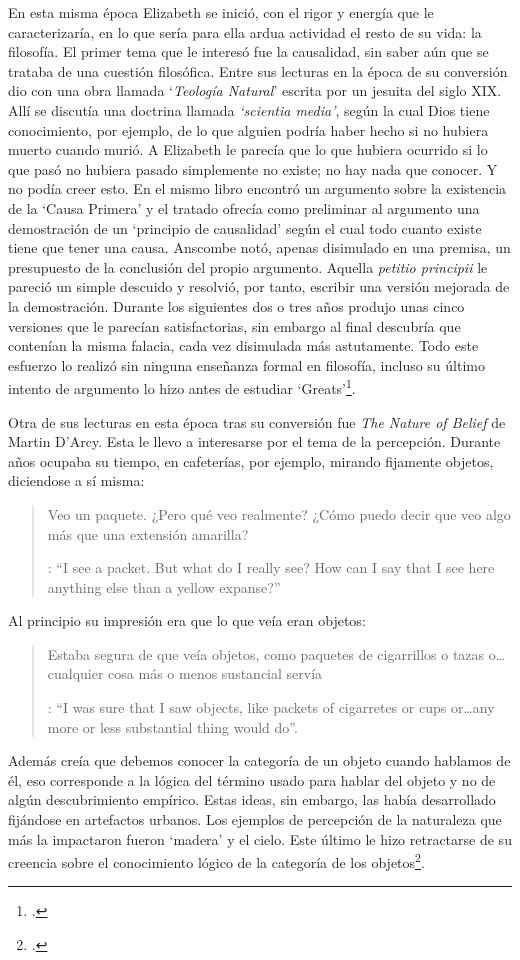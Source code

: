 En esta misma época Elizabeth se inició, con el rigor y energía que le caracterizaría, en lo que sería para ella ardua actividad el resto de su vida: la filosofía. El primer tema que le interesó fue la causalidad, sin saber aún que se trataba de una cuestión filosófica. Entre sus lecturas en la época de su conversión dio con una obra llamada `\emph{Teología Natural}' escrita por un jesuita del siglo XIX. Allí se discutía una doctrina llamada \emph{`scientia media'}, según la cual Dios tiene conocimiento, por ejemplo, de lo que alguien podría haber hecho si no hubiera muerto cuando murió. A Elizabeth le parecía que lo que hubiera ocurrido si lo que pasó no hubiera pasado simplemente no existe; no hay nada que conocer. Y no podía creer esto. En el mismo libro encontró un argumento sobre la existencia de la `Causa Primera' y el tratado ofrecía como preliminar al argumento una demostración de un `principio de causalidad' según el cual todo cuanto existe tiene que tener una causa. Anscombe notó, apenas disimulado en una premisa, un presupuesto de la conclusión del propio argumento. Aquella \emph{petitio principii} le pareció un simple descuido y resolvió, por tanto, escribir una versión mejorada de la demostración. Durante los siguientes dos o tres años produjo unas cinco versiones que le parecían satisfactorias, sin embargo al final descubría que contenían la misma falacia, cada vez disimulada más astutamente. Todo este esfuerzo lo realizó sin ninguna enseñanza formal en filosofía, incluso su último intento de argumento lo hizo antes de estudiar `Greats'\footcite[Cf.][vii]{anscombe1981metaphysics}.

Otra de sus lecturas en esta época tras su conversión fue \emph{The Nature of Belief} de Martin D'Arcy. Esta le llevo a interesarse por el tema de la percepción. Durante años ocupaba su tiempo, en cafeterías, por ejemplo, mirando fijamente objetos, diciendose a sí misma: \blockquote[{\Cite[viii]{anscombe1981metaphysics}}: \enquote{I see a packet. But what do I really see? How can I say that I see here anything else than a yellow expanse?}]{Veo un paquete. ¿Pero qué veo realmente? ¿Cómo puedo decir que veo algo más que una extensión amarilla?} Al principio su impresión era que lo que veía eran objetos: \blockquote[{\Cite[viii]{anscombe1981metaphysics}}: \enquote{I was sure that I saw objects, like packets of cigarretes or cups or\ldots any more or less substantial thing would do}.]{Estaba segura de que veía objetos, como paquetes de cigarrillos o tazas o\ldots cualquier cosa más o menos sustancial servía}. Además creía que debemos conocer la categoría de un objeto cuando hablamos de él, eso corresponde a la lógica del término usado para hablar del objeto y no de algún descubrimiento empírico. Estas ideas, sin embargo, las había desarrollado fijándose en artefactos urbanos. Los ejemplos de percepción de la naturaleza que más la impactaron fueron `madera' y el cielo. Este último le hizo retractarse de su creencia sobre el conocimiento lógico de la categoría de los objetos\footcite[Cf.][viii]{anscombe1981metaphysics}.

